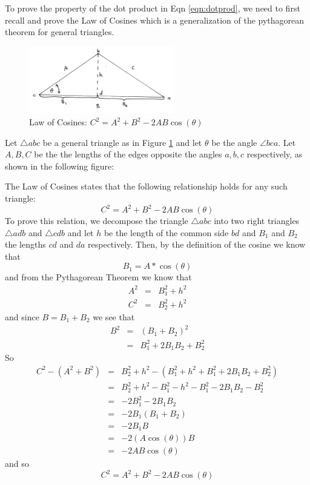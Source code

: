 \documentclass{book}
\begin{document}
To prove the property of the dot product in Eqn \ref{eqn:dotprod},
 we need to first recall and prove the Law of Cosines
which is a generalization of the pythagorean theorem for general triangles.

\begin{figure}[h]
\centering
\includegraphics[width=2.5in]{images/lawofcosB.jpg}

\caption{Law of Cosines: $C^2 = A^2 + B^2 - 2AB \cos(\theta)$  \label{fig:lawofcos}}
\end{figure}

Let $\triangle abc$ be a general triangle as in Figure \ref{fig:lawofcos}
and let $\theta$ be the angle $\angle bca$.
Let $A,B,C$ be the the lengths of the edges opposite the angles $a,b,c$ respectively,
as shown in the following figure:

The Law of Cosines states that the following relationship holds for any such triangle:
\[
C^2 = A^2 + B^2 - 2AB\cos(\theta)
\]
To prove this relation, we decompose the triangle $\triangle abc$ into two right triangles
$\triangle adb$ and $\triangle cdb$ and let $h$ be the length of the common side $bd$
and $B_1$ and $B_2$ the lengths $cd$ and $da$ respectively. Then, by the definition of
the cosine we know that
\[
B_1 = A*\cos(\theta)
\]
and from the Pythagorean Theorem we know that
\begin{eqnarray*}
A^2 &=& B_1^2 + h^2 \\
C^2 &=& B_2^2 + h^2
\end{eqnarray*}
and since $B = B_1 + B_2$ we see that
\begin{eqnarray*}
B^2 &=& (B_1+B_2)^2 \\
&=& B_1^2 + 2B_1B_2 + B_2^2
\end{eqnarray*}
So
\begin{eqnarray*}
C^2-(A^2 + B^2) &=& B_2^2 + h^2  - (B_1^2 + h^2 + B_1^2 + 2B_1B_2 + B_2^2) \\
&=& B_2^2 + h^2  - B_1^2 - h^2 - B_1^2 - 2B_1B_2 - B_2^2 \\
&=&  -2 B_1^2 - 2B_1B_2  \\
&=&  -2 B_1(B_1+B_2) \\
&=&  -2 B_1 B \\
&=&  -2 (A \cos(\theta)) B \\
&=&  -2 A  B \cos(\theta)
\end{eqnarray*}
and so
\[
C^2 = A^2 + B^2 - 2 A B \cos(\theta)
\]
\end{document}
